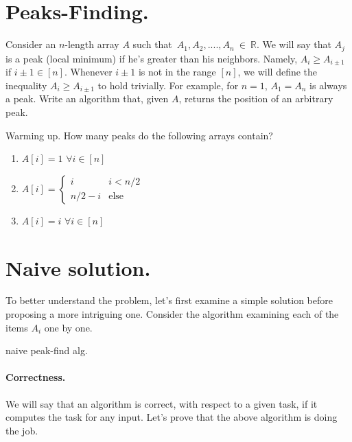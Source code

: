 \section{Peaks-Finding.}
\begin{example}
Consider an \(n\)-length array $A$ such that~$A_1,A_2,....,A_n~\in~\mathbb{R}$. We will say that $A_{j}$ is a peak (local minimum) if he's greater than his neighbors. Namely, $A_{i} \ge A_{i\pm1}$ if $i\pm 1 \in [n]$. Whenever $i\pm 1$ is not in the range $[n]$, we will define the inequality $A_{i} \ge A_{i\pm 1}$ to hold trivially. For example, for $n=1$, $A_{1}=A_{n}$ is always a peak. Write an algorithm that, given $A$, returns the position of an arbitrary peak.
\end{example}


\begin{example}{Warming up.} \label{example:func} How many peaks do the following arrays contain?
  \begin{enumerate}
    \item $A[i] = 1$   $\forall i \in [n]$
    \item $A[i] = \begin{cases}
        i & i < n/2 \\
        n/2 - i & \text{else}
      \end{cases}$
    \item $A[i] = i $  $\forall i \in [n]$
  \end{enumerate}
\end{example}

\section{Naive solution.}
To better understand the problem, let's first examine a simple solution before proposing a more intriguing one. Consider the algorithm examining each of the items $A_{i}$ one by one.
\begin{algorithm}
\caption{naive peak-find alg.}
  { 
    } 
\end{algorithm}
\paragraph{Correctness.}
We will say that an algorithm is correct, with respect to a given task, if it computes the task for any input. Let's prove that the above algorithm is doing the job. 

